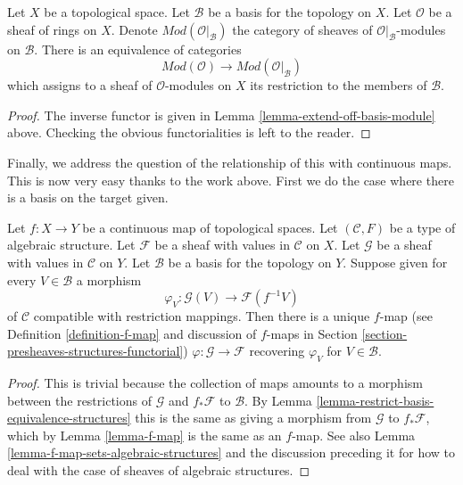 \begin{lemma}
\label{lemma-restrict-basis-equivalence-modules}
Let $X$ be a topological space.
Let $\mathcal{B}$ be a basis for the topology on $X$.
Let $\mathcal{O}$ be a sheaf of rings on $X$.
Denote $\textit{Mod}(\mathcal{O}|_\mathcal{B})$ the category of
sheaves of $\mathcal{O}|_\mathcal{B}$-modules on $\mathcal{B}$.
There is an equivalence of categories
$$
\textit{Mod}(\mathcal{O})
\longrightarrow
\textit{Mod}(\mathcal{O}|_\mathcal{B})
$$
which assigns to a sheaf of $\mathcal{O}$-modules on $X$ its restriction to
the members of $\mathcal{B}$.
\end{lemma}

\begin{proof}
The inverse functor is given in
Lemma \ref{lemma-extend-off-basis-module} above.
Checking the obvious functorialities is left to the reader.
\end{proof}

\noindent
Finally, we address the question of the relationship of this with
continuous maps. This is now very easy thanks to the work
above. First we do the case where there is a basis on the
target given.

\begin{lemma}
\label{lemma-f-map-basis-below-structures}
Let $f : X \to Y$ be a continuous map of topological spaces.
Let $(\mathcal{C}, F)$ be a type of algebraic structure.
Let $\mathcal{F}$ be a sheaf with values in $\mathcal{C}$ on $X$.
Let $\mathcal{G}$ be a sheaf with values in $\mathcal{C}$ on $Y$.
Let $\mathcal{B}$ be a basis for the topology on $Y$.
Suppose given for every $V \in \mathcal{B}$ a morphism
$$
\varphi_V :
\mathcal{G}(V)
\longrightarrow
\mathcal{F}(f^{-1}V)
$$
of $\mathcal{C}$ compatible with restriction mappings.
Then there is a unique $f$-map (see Definition \ref{definition-f-map}
and discussion of $f$-maps in
Section \ref{section-presheaves-structures-functorial})
$\varphi : \mathcal{G} \to \mathcal{F}$
recovering $\varphi_V$ for $V \in \mathcal{B}$.
\end{lemma}

\begin{proof}
This is trivial because the collection of maps
amounts to a morphism between the restrictions
of $\mathcal{G}$ and $f_*\mathcal{F}$ to $\mathcal{B}$.
By Lemma \ref{lemma-restrict-basis-equivalence-structures}
this is the same as giving a morphism from $\mathcal{G}$
to $f_*\mathcal{F}$, which by Lemma \ref{lemma-f-map}
is the same as an $f$-map. See also
Lemma \ref{lemma-f-map-sets-algebraic-structures}
and the discussion preceding it
for how to deal with the case of sheaves of algebraic structures.
\end{proof}

